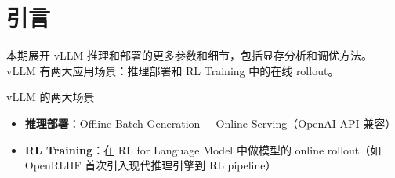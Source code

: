 \section{引言}
本期展开 vLLM 推理和部署的更多参数和细节，包括显存分析和调优方法。vLLM 有两大应用场景：推理部署和 RL Training 中的在线 rollout。

\begin{importantbox}{vLLM 的两大场景}
\begin{itemize}
  \item \textbf{推理部署}：Offline Batch Generation + Online Serving（OpenAI API 兼容）
  \item \textbf{RL Training}：在 RL for Language Model 中做模型的 online rollout（如 OpenRLHF 首次引入现代推理引擎到 RL pipeline）
\end{itemize}
\end{importantbox}

